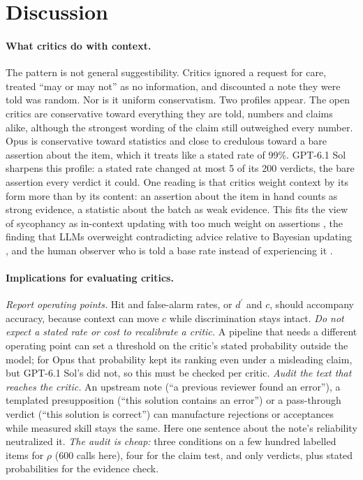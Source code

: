 \documentclass[letterpaper]{article} %
\newcommand{\dprime}{d^{\prime}}
\begin{document}
\section{Discussion}

\paragraph{What critics do with context.} The pattern is not general suggestibility. Critics ignored a request for care, treated ``may or may not'' as no information, and discounted a note they were told was random. Nor is it uniform conservatism. Two profiles appear. The open critics are conservative toward everything they are told, numbers and claims alike, although the strongest wording of the claim still outweighed every number. Opus is conservative toward statistics and close to credulous toward a bare assertion about the item, which it treats like a stated rate of 99\%. GPT-6.1 Sol sharpens this profile: a stated rate changed at most 5 of its 200 verdicts, the bare assertion every verdict it could. One reading is that critics weight context by its form more than by its content: an assertion about the item in hand counts as strong evidence, a statistic about the batch as weak evidence. This fits the view of sycophancy as in-context updating with too much weight on assertions \citep{shapira2026sycophancy}, the finding that LLMs overweight contradicting advice relative to Bayesian updating \citep{kumaran2025overconfidence}, and the human observer who is told a base rate instead of experiencing it \citep{estes1995interactions}.

\paragraph{Implications for evaluating critics.} \emph{Report operating points.} Hit and false-alarm rates, or $\dprime$ and $c$, should accompany accuracy, because context can move $c$ while discrimination stays intact. \emph{Do not expect a stated rate or cost to recalibrate a critic.} A pipeline that needs a different operating point can set a threshold on the critic's stated probability outside the model; for Opus that probability kept its ranking even under a misleading claim, but GPT-6.1 Sol's did not, so this must be checked per critic. \emph{Audit the text that reaches the critic.} An upstream note (``a previous reviewer found an error''), a templated presupposition (``this solution contains an error'') or a pass-through verdict (``this solution is correct'') can manufacture rejections or acceptances while measured skill stays the same. Here one sentence about the note's reliability neutralized it. \emph{The audit is cheap:} three conditions on a few hundred labelled items for $\rho$ (600 calls here), four for the claim test, and only verdicts, plus stated probabilities for the evidence check.
\end{document}
